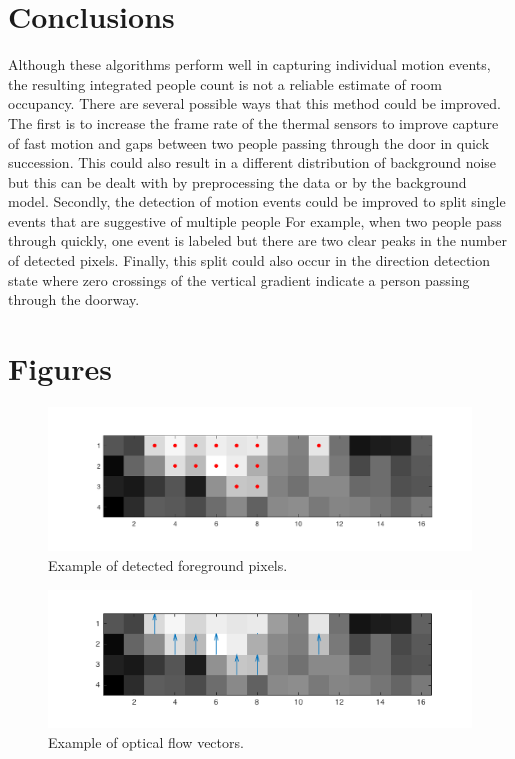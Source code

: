 \documentclass[12pt,oneside]{article} %
\begin{document}
\section{Conclusions} %
Although these algorithms perform well in capturing individual motion events, the resulting integrated people count is 
not a reliable estimate of room occupancy. There are several possible ways that this method could be improved. The
first is to increase the frame rate of the thermal sensors to improve capture of fast motion and gaps between 
two people passing through the door in quick succession. This could also result in a different distribution of 
background noise but this can be dealt with by preprocessing the data or by the background model. Secondly,
the detection of motion events could be improved to split single events that are suggestive of multiple people
For example, when two people pass through quickly, one event is labeled but there are two clear peaks in the
number of detected pixels. Finally, this split could also occur in the direction detection state where zero crossings
of the vertical gradient indicate a person passing through the doorway.

\newpage
\section{Figures} %
\begin{figure}[htb] 
\centering
\includegraphics[scale=0.45]{images/foreground_example.png}
\caption{Example of detected foreground pixels.}
\label{bgd}
\end{figure}

\begin{figure}[htb]
\centering
\includegraphics[scale=0.52]{images/quiver_gradients.png}
\caption{Example of optical flow vectors.}
\label{opflw}
\end{figure}
\end{document}
